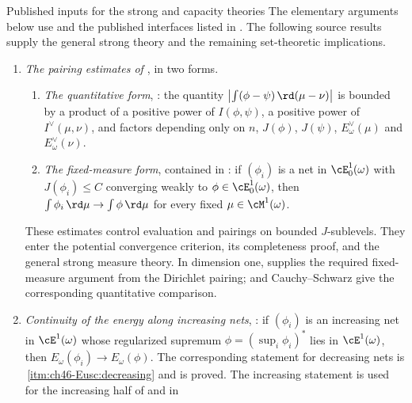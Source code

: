 \begin{important}{Published inputs for the strong and capacity theories}
\label{imp:ch48-imported}
The elementary arguments below use
 and the published
interfaces listed in . The following source
results supply the general strong theory and the remaining set-theoretic
implications.
\begin{enumerate}
\item\label{itm:ch48-import:pairing}
      \emph{The pairing estimates of \cite[\S10]{BJ22}}, in two forms.
      \begin{enumerate}
      \item[(a)] \emph{The quantitative form}, \cite[Theorem~10.3]{BJ22}:
            the quantity $\bigl|\int(\phi-\psi)\,\rd(\mu-\nu)\bigr|$ is
            bounded by a product of a positive power of $I(\phi,\psi)$,
            a positive power of $I^\vee(\mu,\nu)$, and factors depending
            only on $n$, $J(\phi)$, $J(\psi)$,
            $E^\vee_\omega(\mu)$ and $E^\vee_\omega(\nu)$.
      \item[(b)] \emph{The fixed-measure form}, contained in
            \cite[Proposition~9.19]{BJ22}: if $(\phi_i)$ is a net in
            $\cE^1_0(\omega)$ with $J(\phi_i)\le C$ converging weakly
            to $\phi\in\cE^1_0(\omega)$, then
            $\int\phi_i\,\rd\mu\to\int\phi\,\rd\mu$ for every fixed
            $\mu\in\cM^1(\omega)$.
      \end{enumerate}
      These estimates control evaluation and pairings on bounded
      $J$-sublevels. They enter the potential convergence criterion,
      its completeness proof, and the general strong measure theory.
      In dimension one,  supplies the
      required fixed-measure argument from the Dirichlet pairing;
       and Cauchy--Schwarz give the
      corresponding quantitative comparison.
\item\label{itm:ch48-import:increasing}
      \emph{Continuity of the energy along increasing nets},
      \cite[Theorem~12.5]{BJ22}: if $(\phi_i)$ is an increasing net in
      $\cE^1(\omega)$ whose regularized supremum
      $\phi=(\sup_i\phi_i)^*$ lies in $\cE^1(\omega)$, then
      $E_\omega(\phi_i)\to E_\omega(\phi)$.  The corresponding statement
      for decreasing nets is
      \,\cref{itm:ch46-Eusc:decreasing} and is
      proved.  The increasing statement is used for the increasing half of
       and in

\end{enumerate}
\end{important}
